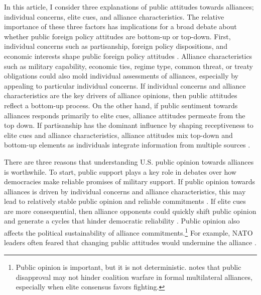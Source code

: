 \documentclass[12pt]{article}
\begin{document}
In this article, I consider three explanations of public attitudes towards alliances; individual concerns, elite cues, and alliance characteristics.
The relative importance of these three factors has implications for a broad debate about whether public foreign policy attitudes are bottom-up or top-down. 
First, individual concerns such as partisanship, foreign policy dispositions, and economic interests shape public foreign policy attitudes \citep{KertzerZeitzoff2017}.
Alliance characteristics such as military capability, economic ties, regime type, common threat, or treaty obligations could also mold individual assessments of alliances, especially by appealing to particular individual concerns. 
If individual concerns and alliance characteristics are the key drivers of alliance opinions, then public attitudes reflect a bottom-up process. 
On the other hand, if public sentiment towards alliances responds primarily to elite cues, alliance attitudes permeate from the top down.
If partisanship has the dominant influence by shaping receptiveness to elite cues and alliance characteristics, alliance attitudes mix top-down and bottom-up elements as individuals integrate information from multiple sources \citep{PageShapiro1992}.  


There are three reasons that understanding U.S. public opinion towards alliances is worthwhile. 
To start, public support plays a key role in debates over how democracies make reliable promises of military support. 
If public opinion towards alliances is driven by individual concerns and alliance characteristics, this may lead to relatively stable public opinion and reliable commitments \citep{Gaubatz1996}.
If elite cues are more consequential, then alliance opponents could quickly shift public opinion and generate a cycles that hinder democratic reliability \citep{GartzkeGleditsch2004}.
Public opinion also affects the political sustainability of alliance commitments.\footnote{Public opinion is important, but it is not deterministic. \citet{Kreps2010} notes that public disapproval may not hinder coalition warfare in formal multilateral alliances, especially when elite consensus favors fighting.}
For example, NATO leaders often feared that changing public attitudes would undermine the alliance \citep{Sayle2019}.   
\end{document}
